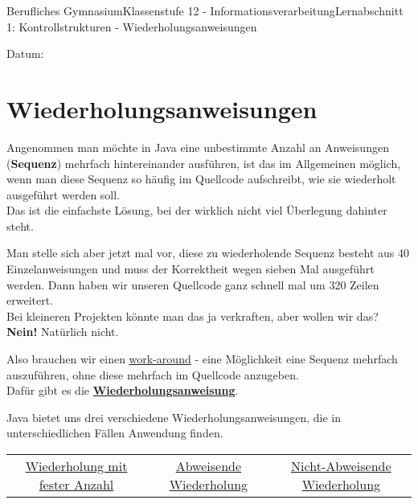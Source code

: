 \documentclass[11pt,oneside,openany,headings=optiontotoc,11pt,numbers=noenddot]{article}
\begin{document}
	\begin{worksheet}{Berufliches Gymnasium}{Klassenstufe 12 - Informationsverarbeitung}{Lernabschnitt 1: Kontrollstrukturen - Wiederholungsanweisungen}
		\setlength{\columnseprule}{0pt}
		\begin{framed}
			Datum:
		\end{framed}
		\section{Wiederholungsanweisungen}
		Angenommen man möchte in Java eine unbestimmte Anzahl an Anweisungen (\textbf{Sequenz}) mehrfach hintereinander ausführen, ist das im Allgemeinen möglich, wenn man diese Sequenz so häufig im Quellcode aufschreibt, wie sie wiederholt ausgeführt werden soll.\\
		Das ist die einfachste Lösung, bei der wirklich nicht viel Überlegung dahinter steht.\\
		\par\noindent
		Man stelle sich aber jetzt mal vor, diese zu wiederholende Sequenz besteht aus 40 Einzelanweisungen und muss der Korrektheit wegen sieben Mal ausgeführt werden. Dann haben wir unseren Quellcode ganz schnell mal um 320 Zeilen erweitert.\\
		Bei kleineren Projekten könnte man das ja verkraften, aber wollen wir das? \textbf{Nein!} Natürlich nicht.
		\par
		Also brauchen wir einen \underline{work-around} - eine Möglichkeit eine Sequenz mehrfach auszuführen, ohne diese mehrfach im Quellcode anzugeben.\\
		Dafür gibt es die \textbf{\underline{Wiederholungsanweisung}}.\\
		\par\noindent
		Java bietet uns drei verschiedene Wiederholungsanweisungen, die in unterschiedlichen Fällen Anwendung finden.\\
		\begin{tabularx}{\textwidth}{ccc}
			\underline{Wiederholung mit fester Anzahl} & \underline{Abweisende Wiederholung} & \underline{Nicht-Abweisende Wiederholung}
		\end{tabularx}

\end{worksheet}
\end{document}
